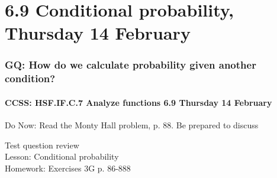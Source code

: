 \documentclass{beamer}
\begin{document}
\section{6.9 Conditional probability, Thursday 14 February}
  \frame
  {
    \frametitle{GQ: How do we calculate probability given another condition?}
    \framesubtitle{CCSS: HSF.IF.C.7 Analyze functions \hfill \alert{6.9 Thursday 14 February}}

    \begin{block}{Do Now: Read the Monty Hall problem, p. 88. Be prepared to discuss}
    \end{block}
    Test question review\\
    Lesson: Conditional probability\\[0.5cm]
    Homework: Exercises 3G p. 86-888
  }
\end{document}
